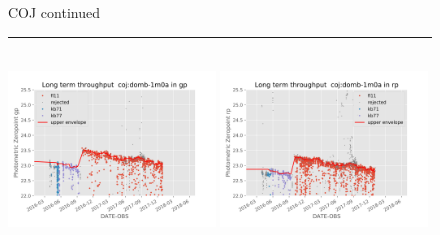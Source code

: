 \documentclass[]{spieman}
\begin{document}
\begin{figure}\ContinuedFloat
\centering 
COJ continued \\ 
\rule{\textwidth}{0.4pt} \\

\includegraphics[width=0.49\textwidth]{images/photzptrend-coj-domb-1m0a-gp.png} \hspace*{\fill} 
\includegraphics[width=0.49\textwidth]{images/photzptrend-coj-domb-1m0a-rp.png} \\[1ex]


\end{figure}
\end{document}
